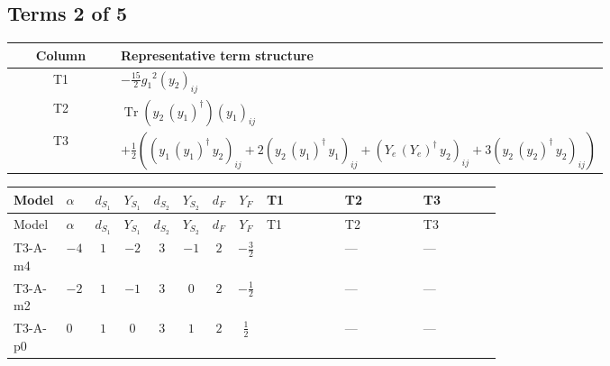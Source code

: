 \documentclass[8pt]{article}
\begin{document}
\begin{landscape}
\subsection*{Terms 2 of 5}
\begin{center}
\begin{tabular}{@{}c >{\raggedright\arraybackslash}p{0.82\linewidth}@{}}
\toprule
Column & Representative term structure \\
\midrule
T1 & \(\displaystyle -\frac{15}{2} {g_1}^2 \left({y_2}\right)_{ij}\) \\
\midrule
T2 & \(\displaystyle \operatorname{Tr}\!\left({y_2}\,\left({y_1}\right)^{\dagger}\right) \left({y_1}\right)_{ij}\) \\
\midrule
T3 & \(\displaystyle +\frac{1}{2} (\left({y_1}\,\left({y_1}\right)^{\dagger}\,{y_2}\right)_{ij}+2 \left({y_2}\,\left({y_1}\right)^{\dagger}\,{y_1}\right)_{ij}+\left({Y_e}\,\left({Y_e}\right)^{\dagger}\,{y_2}\right)_{ij}+3 \left({y_2}\,\left({y_2}\right)^{\dagger}\,{y_2}\right)_{ij})\) \\
\midrule
\bottomrule
\end{tabular}
\end{center}
\smallskip
\tiny
\begin{longtable}{@{}llcccccc >{\raggedright\arraybackslash}p{0.21\linewidth} >{\raggedright\arraybackslash}p{0.21\linewidth} >{\raggedright\arraybackslash}p{0.21\linewidth}@{}}
\toprule
Model & $\alpha$ & $d_{S_1}$ & $Y_{S_1}$ & $d_{S_2}$ & $Y_{S_2}$ & $d_F$ & $Y_F$ & T1 & T2 & T3 \\
\midrule
\endfirsthead
\toprule
Model & $\alpha$ & $d_{S_1}$ & $Y_{S_1}$ & $d_{S_2}$ & $Y_{S_2}$ & $d_F$ & $Y_F$ & T1 & T2 & T3 \\
\midrule
\endhead
T3-A-m4 & $-4$ & $1$ & $-2$ & $3$ & $-1$ & $2$ & $-\frac{3}{2}$ & \scriptsize\adjustbox{max width=\linewidth}{$\begin{gathered} -\frac{15}{2} {g_1}^2 \left({y_2}\right)_{ij}\end{gathered}$} & --- & --- \\
\midrule
T3-A-m2 & $-2$ & $1$ & $-1$ & $3$ & $0$ & $2$ & $-\frac{1}{2}$ & \scriptsize\adjustbox{max width=\linewidth}{$\begin{gathered} -\frac{3}{2} {g_1}^2 \left({y_2}\right)_{ij}\end{gathered}$} & --- & --- \\
\midrule
T3-A-p0 & $0$ & $1$ & $0$ & $3$ & $1$ & $2$ & $\frac{1}{2}$ & \scriptsize\adjustbox{max width=\linewidth}{$\begin{gathered} -\frac{3}{2} {g_1}^2 \left({y_2}\right)_{ij}\end{gathered}$} & --- & --- \\

\end{longtable}
\end{landscape}
\end{document}
